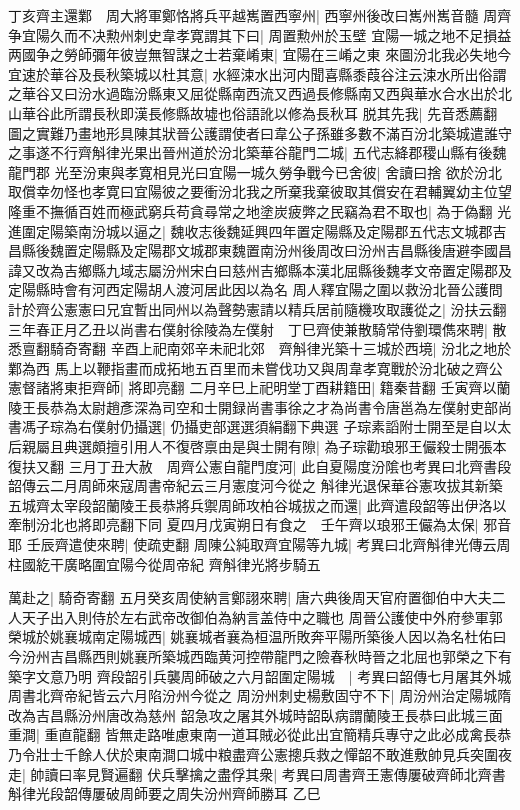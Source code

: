 丁亥齊主還鄴　周大將軍鄭恪將兵平越嶲置西寧州|{
	西寧州後改曰嶲州嶲音髓}
周齊争宜陽久而不决勲州刺史韋孝寛謂其下曰|{
	周置勲州於玉壁}
宜陽一城之地不足損益两國争之勞師彌年彼豈無智謀之士若棄崤東|{
	宜陽在三崤之東}
來圖汾北我必失地今宜速於華谷及長秋築城以杜其意|{
	水經涑水出河内聞喜縣黍葭谷注云涑水所出俗謂之華谷又曰汾水過臨汾縣東又屈從縣南西流又西過長修縣南又西與華水合水出於北山華谷此所謂長秋即漢長修縣故墟也俗語訛以修為長秋耳}
脱其先我|{
	先音悉薦翻}
圖之實難乃畫地形具陳其狀晉公護謂使者曰韋公子孫雖多數不滿百汾北築城遣誰守之事遂不行齊斛律光果出晉州道於汾北築華谷龍門二城|{
	五代志絳郡稷山縣有後魏龍門郡}
光至汾東與孝寛相見光曰宜陽一城久勞争戰今已舍彼|{
	舍讀曰捨}
欲於汾北取償幸勿怪也孝寛曰宜陽彼之要衝汾北我之所棄我棄彼取其償安在君輔翼幼主位望隆重不撫循百姓而極武窮兵苟貪尋常之地塗炭疲弊之民竊為君不取也|{
	為于偽翻}
光進圍定陽築南汾城以逼之|{
	魏收志後魏延興四年置定陽縣及定陽郡五代志文城郡吉昌縣後魏置定陽縣及定陽郡文城郡東魏置南汾州後周改曰汾州吉昌縣後唐避李國昌諱又改為吉鄉縣九域志屬汾州宋白曰慈州吉鄉縣本漢北屈縣後魏孝文帝置定陽郡及定陽縣時會有河西定陽胡人渡河居此因以為名}
周人釋宜陽之圍以救汾北晉公護問計於齊公憲憲曰兄宜暫出同州以為聲勢憲請以精兵居前隨機攻取護從之|{
	汾扶云翻}
三年春正月乙丑以尚書右僕射徐陵為左僕射　丁巳齊使兼散騎常侍劉環儁來聘|{
	散悉亶翻騎奇寄翻}
辛酉上祀南郊辛未祀北郊　齊斛律光築十三城於西境|{
	汾北之地於鄴為西}
馬上以鞭指畫而成拓地五百里而未嘗伐功又與周韋孝寛戰於汾北破之齊公憲督諸將東拒齊師|{
	將即亮翻}
二月辛巳上祀明堂丁酉耕籍田|{
	籍秦昔翻}
壬寅齊以蘭陵王長恭為太尉趙彥深為司空和士開録尚書事徐之才為尚書令唐邕為左僕射吏部尚書馮子琮為右僕射仍攝選|{
	仍攝吏部選選須絹翻下典選}
子琮素謟附士開至是自以太后親屬且典選頗擅引用人不復啓禀由是與士開有隙|{
	為子琮勸琅邪王儼殺士開張本復扶又翻}
三月丁丑大赦　周齊公憲自龍門度河|{
	此自夏陽度汾隂也考異曰北齊書段韶傳云二月周師來寇周書帝紀云三月憲度河今從之}
斛律光退保華谷憲攻拔其新築五城齊太宰段韶蘭陵王長恭將兵禦周師攻柏谷城拔之而還|{
	此齊遣段韶等出伊洛以牽制汾北也將即亮翻下同}
夏四月戊寅朔日有食之　壬午齊以琅邪王儼為太保|{
	邪音耶}
壬辰齊遣使來聘|{
	使疏吏翻}
周陳公純取齊宜陽等九城|{
	考異曰北齊斛律光傳云周柱國紇干廣略圍宜陽今從周帝紀}
齊斛律光將步騎五

萬赴之|{
	騎奇寄翻}
五月癸亥周使納言鄭詡來聘|{
	唐六典後周天官府置御伯中大夫二人天子出入則侍於左右武帝改御伯為納言盖侍中之職也}
周晉公護使中外府參軍郭榮城於姚襄城南定陽城西|{
	姚襄城者襄為桓温所敗奔平陽所築後人因以為名杜佑曰今汾州吉昌縣西則姚襄所築城西臨黄河控帶龍門之險春秋時晉之北屈也郭榮之下有築字文意乃明}
齊段韶引兵襲周師破之六月韶圍定陽城　|{
	考異曰韶傳七月屠其外城周書北齊帝紀皆云六月陷汾州今從之}
周汾州刺史楊敷固守不下|{
	周汾州治定陽城隋改為吉昌縣汾州唐改為慈州}
韶急攻之屠其外城時韶臥病謂蘭陵王長恭曰此城三面重澗|{
	重直龍翻}
皆無走路唯慮東南一道耳賊必從此出宜簡精兵專守之此必成禽長恭乃令壯士千餘人伏於東南澗口城中粮盡齊公憲摠兵救之憚韶不敢進敷帥見兵突圍夜走|{
	帥讀曰率見賢遍翻}
伏兵擊擒之盡俘其衆|{
	考異曰周書齊王憲傳屢破齊師北齊書斛律光段韶傳屢破周師要之周失汾州齊師勝耳}
乙巳

